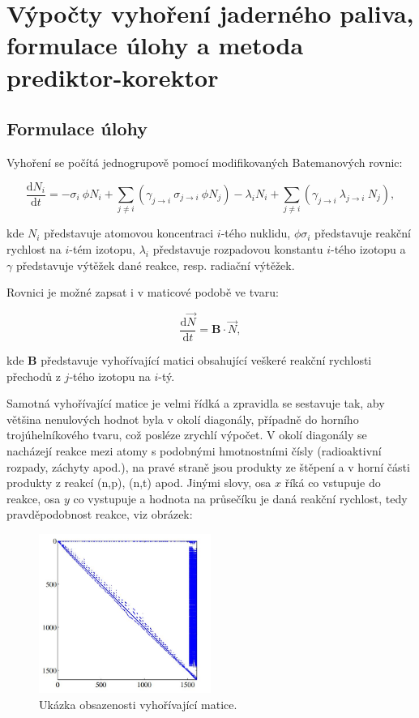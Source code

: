 \section[Vyhořívání]{Výpočty vyhoření jaderného paliva, formulace úlohy a metoda prediktor-korektor}

\subsection{Formulace úlohy}

Vyhoření se počítá jednogrupově pomocí modifikovaných Batemanových rovnic:

\begin{equation}
  \dfrac{\text{d}N_i}{\text{d}t} = -\sigma_i \: \phi N_i + \sum_{j \neq i} \left(\gamma_{j \to i} \: \sigma_{j \to i} \: \phi N_j \right) - \lambda_i N_i + \sum_{j \neq i} \left( \gamma_{j \to i} \: \lambda_{j \to i} \: N_j \right),
\end{equation}

kde $N_i$ představuje atomovou koncentraci $i$-tého nuklidu, $\phi \sigma_i$ představuje reakční rychlost na $i$-tém izotopu, $\lambda_i$ představuje rozpadovou konstantu $i$-tého izotopu a $\gamma$ představuje výtěžek dané reakce, resp. radiační výtěžek.

Rovnici je možné zapsat i v maticové podobě ve tvaru:

\begin{equation}
  \dfrac{\text{d}\vec{N}}{\text{d}t} = \mathbf{B} \cdot \vec{N},
\end{equation}

kde $\mathbf{B}$ představuje vyhořívající matici obsahující veškeré reakční rychlosti přechodů z $j$-tého izotopu na $i$-tý.

Samotná vyhořívající matice je velmi řídká a zpravidla se sestavuje tak, aby většina nenulových hodnot byla v okolí diagonály, případně do horního trojúhelníkového tvaru, což posléze zrychlí výpočet. V okolí diagonály se nacházejí reakce mezi atomy s podobnými hmotnostními čísly (radioaktivní rozpady, záchyty apod.), na pravé straně jsou produkty ze štěpení a v horní části produkty z reakcí (n,p), (n,t) apod. Jinými slovy, osa $x$ říká co vstupuje do reakce, osa $y$ co vystupuje a hodnota na průsečíku je daná reakční rychlost, tedy pravděpodobnost reakce, viz obrázek:

\begin{figure}[H]
  \centering
  \includegraphics[width=0.5\textwidth]{img/burnup_matrix.JPG}
  \caption{Ukázka obsazenosti vyhořívající matice.}
\end{figure}

